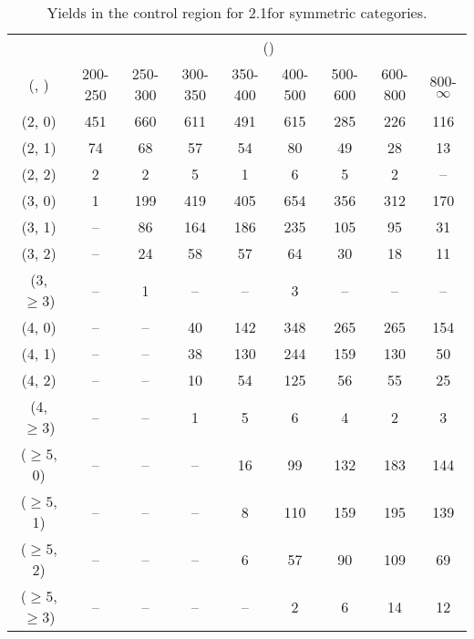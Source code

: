 \begin{table}[h!]
\tiny
\centering
\caption{Yields in the \mj control region for 2.1\ifb for symmetric categories.\label{tab:yieldssep_mu_data_sym}}
\begin{tabular}
{ccccccccc}
	\hline\hline
	& \multicolumn{8}{c}{\scalht (\gev)} \\ 
	 (\njet,  \nb) & 200-250 & 250-300 & 300-350 & 350-400 & 400-500 & 500-600 & 600-800 & 800-$\infty$ \\ [0.8ex] 
\hline
	(2, 0) & 451 & 660 & 611 & 491 & 615 & 285 & 226 & 116 \\[0.5ex] 
	(2, 1) & 74 & 68 & 57 & 54 & 80 & 49 & 28 & 13 \\[0.5ex] 
	(2, 2) & 2 & 2 & 5 & 1 & 6 & 5 & 2 & -- \\[0.5ex] 
	(3, 0) & 1 & 199 & 419 & 405 & 654 & 356 & 312 & 170 \\[0.5ex] 
	(3, 1) & -- & 86 & 164 & 186 & 235 & 105 & 95 & 31 \\[0.5ex] 
	(3, 2) & -- & 24 & 58 & 57 & 64 & 30 & 18 & 11 \\[0.5ex] 
	(3, $\ge3$) & -- & 1 & -- & -- & 3 & -- & -- & -- \\[0.5ex] 
	(4, 0) & -- & -- & 40 & 142 & 348 & 265 & 265 & 154 \\[0.5ex] 
	(4, 1) & -- & -- & 38 & 130 & 244 & 159 & 130 & 50 \\[0.5ex] 
	(4, 2) & -- & -- & 10 & 54 & 125 & 56 & 55 & 25 \\[0.5ex] 
	(4, $\ge3$) & -- & -- & 1 & 5 & 6 & 4 & 2 & 3 \\[0.5ex] 
	($\ge5$, 0) & -- & -- & -- & 16 & 99 & 132 & 183 & 144 \\[0.5ex] 
	($\ge5$, 1) & -- & -- & -- & 8 & 110 & 159 & 195 & 139 \\[0.5ex] 
	($\ge5$, 2) & -- & -- & -- & 6 & 57 & 90 & 109 & 69 \\[0.5ex] 
	($\ge5$, $\ge3$) & -- & -- & -- & -- & 2 & 6 & 14 & 12 \\[0.5ex] 
	\hline
	\hline
\end{tabular}
\end{table}

